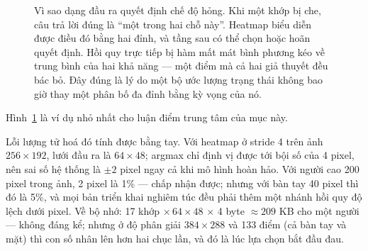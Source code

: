 \documentclass[../../../deep_learning.tex]{subfiles}
\begin{document}
\begin{figure}[H]\centering
{}
\caption{Vì sao dạng đầu ra quyết định chế độ hỏng. Khi một khớp bị che, câu trả lời đúng là ``một trong hai chỗ này''. Heatmap biểu diễn được điều đó bằng hai đỉnh, và tầng sau có thể chọn hoặc hoãn quyết định. Hồi quy trực tiếp bị hàm mất mát bình phương kéo về trung bình của hai khả năng --- một điểm mà cả hai giả thuyết đều bác bỏ. Đây đúng là lý do một bộ ước lượng trạng thái không bao giờ thay một phân bố đa đỉnh bằng kỳ vọng của nó.}
\label{fig:heatmap-vs-regress}
\end{figure}

Hình~\ref{fig:heatmap-vs-regress} là ví dụ nhỏ nhất cho luận điểm trung tâm của mục này.

Lỗi lượng tử hoá đó tính được bằng tay. Với heatmap ở stride 4 trên ảnh \(256\times192\), lưới đầu ra là \(64\times48\); argmax chỉ định vị được tới bội số của 4 pixel, nên sai số hệ thống là \(\pm 2\) pixel ngay cả khi mô hình hoàn hảo. Với người cao 200 pixel trong ảnh, 2 pixel là 1\% --- chấp nhận được; nhưng với bàn tay 40 pixel thì đó là 5\%, và mọi bản triển khai nghiêm túc đều phải thêm một nhánh hồi quy độ lệch dưới pixel. Về bộ nhớ: 17 khớp \(\times\, 64\times48\) \(\times\) 4 byte \(\approx 209\) KB cho một người --- không đáng kể; nhưng ở độ phân giải \(384\times288\) và 133 điểm (cả bàn tay và mặt) thì con số nhân lên hơn hai chục lần, và đó là lúc lựa chọn bắt đầu đau.
\end{document}
